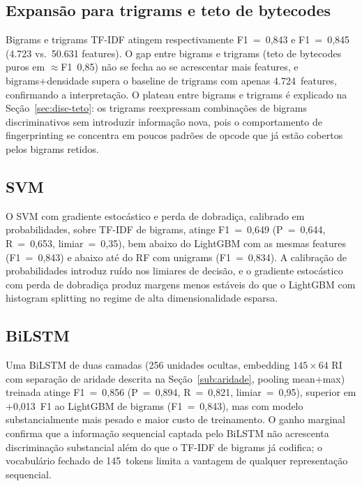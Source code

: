 \subsection{Expansão para trigrams e teto de bytecodes}
\label{sub:trigrams}

Bigrams e trigrams TF-IDF atingem respectivamente F1~=~0,843 e F1~=~0,845
(4.723 vs.\ 50.631 features). O gap entre bigrams e
trigrams (teto de bytecodes puros em $\approx$F1~0,85)
não se fecha ao se acrescentar mais features, e bigrams+densidade supera o baseline
de trigrams com apenas 4.724~features, confirmando a interpretação. O plateau entre bigrams e trigrams é
explicado na Seção~\ref{sec:disc-teto}: os trigrams reexpressam combinações de
bigrams discriminativos sem introduzir informação nova, pois o comportamento de
fingerprinting se concentra em poucos padrões de opcode que já estão cobertos
pelos bigrams retidos.

\subsection{SVM}
\label{sub:svm-exp}

O SVM com gradiente estocástico e perda de dobradiça, calibrado em
probabilidades, sobre TF-IDF de bigrams, atinge F1~=~0,649 (P~=~0,644,
R~=~0,653, limiar~=~0,35), bem abaixo do LightGBM com as mesmas features
(F1~=~0,843) e abaixo até do RF com unigrams (F1~=~0,834). A calibração de
probabilidades introduz ruído nos limiares de decisão, e o gradiente estocástico
com perda de dobradiça produz margens menos estáveis do que o LightGBM com
histogram splitting no regime de alta dimensionalidade esparsa.

\subsection{BiLSTM}
\label{sub:bilstm}

Uma BiLSTM de duas camadas (256 unidades ocultas, embedding $145 \times 64$
RI com separação de aridade descrita na Seção~\ref{sub:aridade},
pooling mean+max) treinada atinge F1~=~0,856 (P~=~0,894,
R~=~0,821, limiar~=~0,95), superior em +0,013~F1 ao LightGBM de bigrams
(F1~=~0,843), mas com modelo substancialmente mais pesado e maior custo de
treinamento. O ganho marginal confirma que a informação sequencial captada pelo BiLSTM
não acrescenta discriminação substancial além do que o TF-IDF de bigrams já codifica;
o vocabulário fechado de 145~tokens limita a vantagem de qualquer representação sequencial.

